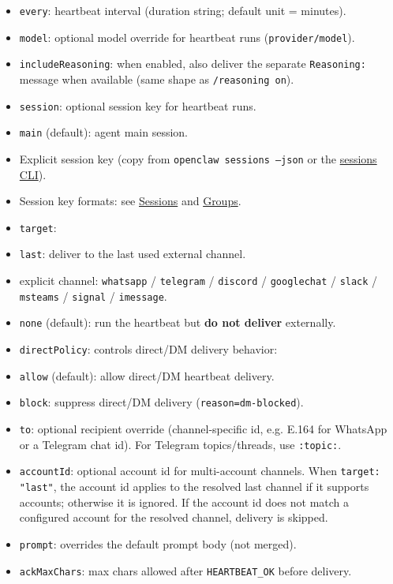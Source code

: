 \begin{itemize}
  \item \texttt{every}: heartbeat interval (duration string; default unit = minutes).
  \item \texttt{model}: optional model override for heartbeat runs (\texttt{provider/model}).
  \item \texttt{includeReasoning}: when enabled, also deliver the separate \texttt{Reasoning:} message when available (same shape as \texttt{/reasoning on}).
  \item \texttt{session}: optional session key for heartbeat runs.
  \item \texttt{main} (default): agent main session.
  \item Explicit session key (copy from \texttt{openclaw sessions --json} or the \href{/cli/sessions}{sessions CLI}).
  \item Session key formats: see \href{/concepts/session}{Sessions} and \href{/channels/groups}{Groups}.
  \item \texttt{target}:
  \item \texttt{last}: deliver to the last used external channel.
  \item explicit channel: \texttt{whatsapp} / \texttt{telegram} / \texttt{discord} / \texttt{googlechat} / \texttt{slack} / \texttt{msteams} / \texttt{signal} / \texttt{imessage}.
  \item \texttt{none} (default): run the heartbeat but \textbf{do not deliver} externally.
  \item \texttt{directPolicy}: controls direct/DM delivery behavior:
  \item \texttt{allow} (default): allow direct/DM heartbeat delivery.
  \item \texttt{block}: suppress direct/DM delivery (\texttt{reason=dm-blocked}).
  \item \texttt{to}: optional recipient override (channel-specific id, e.g. E.164 for WhatsApp or a Telegram chat id). For Telegram topics/threads, use \texttt{:topic:}.
  \item \texttt{accountId}: optional account id for multi-account channels. When \texttt{target: "last"}, the account id applies to the resolved last channel if it supports accounts; otherwise it is ignored. If the account id does not match a configured account for the resolved channel, delivery is skipped.
  \item \texttt{prompt}: overrides the default prompt body (not merged).
  \item \texttt{ackMaxChars}: max chars allowed after \texttt{HEARTBEAT\_OK} before delivery.

\end{itemize}
